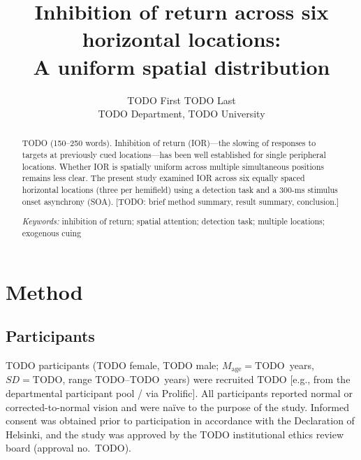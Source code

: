 \documentclass[12pt, a4paper]{article}
\begin{document}
\title{Inhibition of return across six horizontal locations:\\
       A uniform spatial distribution}          %

\author{
    TODO First TODO Last\\
    \small TODO Department, TODO University
}
\date{}
\maketitle
\newpage

\begin{abstract}
\noindent
TODO (150--250 words).
Inhibition of return (IOR)—the slowing of responses to targets at
previously cued locations—has been well established for single
peripheral locations.
Whether IOR is spatially uniform across multiple simultaneous
positions remains less clear.
The present study examined IOR across six equally spaced horizontal
locations (three per hemifield) using a detection task and a 300-ms
stimulus onset asynchrony (SOA).
[TODO: brief method summary, result summary, conclusion.]

\bigskip
\noindent\textit{Keywords:}
inhibition of return;
spatial attention;
detection task;
multiple locations;
exogenous cuing
\end{abstract}

\newpage


\section{Method}
\label{sec:method}

\subsection{Participants}

TODO participants (TODO female, TODO male;
$M_\mathrm{age} = \text{TODO}$~years, $SD = \text{TODO}$,
range TODO--TODO~years) were recruited TODO [e.g., from the departmental
participant pool / via Prolific].
All participants reported normal or corrected-to-normal vision and were
na\"{i}ve to the purpose of the study.
Informed consent was obtained prior to participation in accordance
with the Declaration of Helsinki, and the study was approved by the
TODO institutional ethics review board (approval no.\ TODO).
\end{document}

